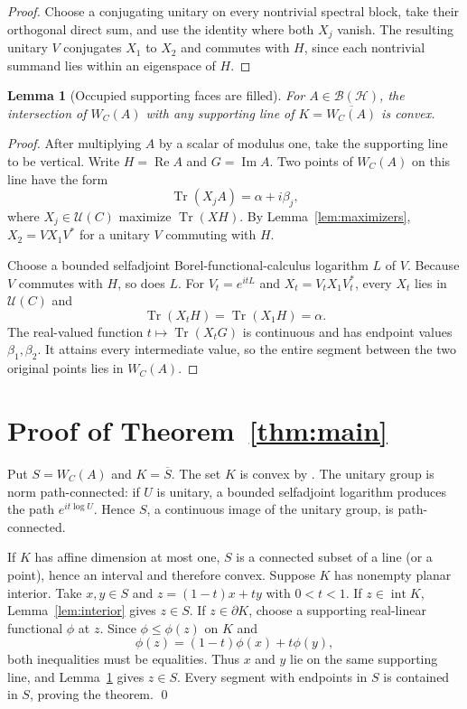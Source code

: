 \documentclass[11pt]{article}
\newtheorem{lemma}[theorem]{Lemma}
\newcommand{\HH}{\mathcal H}
\newcommand{\B}{\mathcal B}
\newcommand{\U}{\mathcal U}
\newcommand{\Tr}{\operatorname{Tr}}
\newcommand{\clos}[1]{\overline{#1}}
\begin{document}
\begin{proof}
Choose a conjugating unitary on every nontrivial spectral block, take their
orthogonal direct sum, and use the identity where both $X_j$ vanish.  The
resulting unitary $V$ conjugates $X_1$ to $X_2$ and commutes with $H$, since
each nontrivial summand lies within an eigenspace of $H$.
\end{proof}

\begin{lemma}[Occupied supporting faces are filled]\label{lem:face}
For $A\in\B(\HH)$, the intersection of $W_C(A)$ with any supporting line of
$K=\clos{W_C(A)}$ is convex.
\end{lemma}

\begin{proof}
After multiplying $A$ by a scalar of modulus one, take the supporting line to
be vertical.  Write $H=\operatorname{Re}A$ and $G=\operatorname{Im}A$.
Two points of $W_C(A)$ on this line have the form
\[
  \Tr(X_jA)=\alpha+i\beta_j,
\]
where $X_j\in\U(C)$ maximize $\Tr(XH)$.  By
Lemma~\ref{lem:maximizers}, $X_2=VX_1V^*$ for a unitary $V$ commuting with
$H$.

Choose a bounded selfadjoint Borel-functional-calculus logarithm $L$ of $V$.
Because $V$ commutes with $H$, so does $L$.  For
$V_t=e^{itL}$ and $X_t=V_tX_1V_t^*$, every $X_t$ lies in $\U(C)$ and
\[
  \Tr(X_tH)=\Tr(X_1H)=\alpha.
\]
The real-valued function $t\mapsto\Tr(X_tG)$ is continuous and has endpoint
values $\beta_1,\beta_2$.  It attains every intermediate value, so the entire
segment between the two original points lies in $W_C(A)$.
\end{proof}

\section{Proof of Theorem~\ref{thm:main}}

Put $S=W_C(A)$ and $K=\clos S$.  The set $K$ is convex by
\cite[Theorem 3.4 and Corollary 4.6]{LP}.  The unitary group is norm
path-connected: if $U$ is unitary, a bounded selfadjoint logarithm produces
the path $e^{it\log U}$.  Hence $S$, a continuous image of the unitary group,
is path-connected.

If $K$ has affine dimension at most one, $S$ is a connected subset of a line
(or a point), hence an interval and therefore convex.  Suppose $K$ has
nonempty planar interior.  Take $x,y\in S$ and $z=(1-t)x+ty$ with $0<t<1$.
If $z\in\operatorname{int}K$, Lemma~\ref{lem:interior} gives $z\in S$.
If $z\in\partial K$, choose a supporting real-linear functional $\phi$ at
$z$.  Since $\phi\leq\phi(z)$ on $K$ and
\[
  \phi(z)=(1-t)\phi(x)+t\phi(y),
\]
both inequalities must be equalities.  Thus $x$ and $y$ lie on the same
supporting line, and Lemma~\ref{lem:face} gives $z\in S$.  Every segment with
endpoints in $S$ is contained in $S$, proving the theorem. \qed
\end{document}
